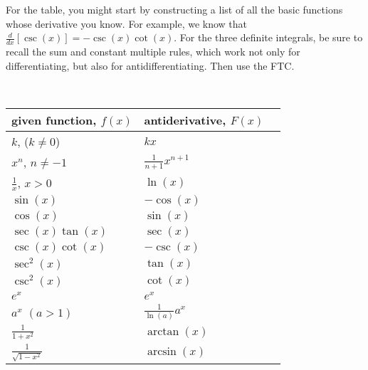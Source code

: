 \begin{bighint}
For the table, you might start by constructing a list of all the basic functions whose derivative you know.  For example, we know that $\frac{d}{dx} [\csc(x)] = -\csc(x) \cot(x).$  For the three definite integrals, be sure to recall the sum and constant multiple rules, which work not only for differentiating, but also for antidifferentiating.  Then use the FTC.
\end{bighint}
\begin{activitySolution}
\vfill \ 
\pagebreak

\begin{center}
\begin{tabular}{ | l || l | }
   \hline 
\T given function, $f(x)$ \hspace{1.25in} &  antiderivative, $F(x)$  \hspace{1.15in} \ \B \\
\hline \hline
\T $k$, ($k \ne 0$) & $kx$ \B \\
\hline
\T $x^n$, $n \ne -1$ & $\frac{1}{n+1}x^{n+1}$ \B \\
\hline 
\T $\frac{1}{x}$, $x > 0$ & $\ln(x)$ \B \\ 
\hline
\T $\sin(x)$ & $-\cos(x)$ \B \\
\hline
\T $\cos(x)$ & $\sin(x)$ \B \\
\hline
\T $\sec(x) \tan(x)$ & $\sec(x)$ \B \\
\hline
\T $\csc(x) \cot(x)$ & $-\csc(x)$ \B \\
\hline
\T $\sec^2 (x)$ & $\tan(x)$ \B \\
\hline
\T $\csc^2 (x)$ & $\cot(x)$ \B \\
\hline
\T $e^x$  & $e^x$ \B \\
\hline
\T $a^x$ $(a > 1)$  & $\frac{1}{\ln(a)} a^x$ \B \\
\hline
\T $\frac{1}{1+x^2}$ & $\arctan(x)$ \B \\
\hline
\T $\frac{1}{\sqrt{1-x^2}}$ & $\arcsin(x)$ \B \\
\hline
\end{tabular} 
\end{center}


\end{activitySolution}
